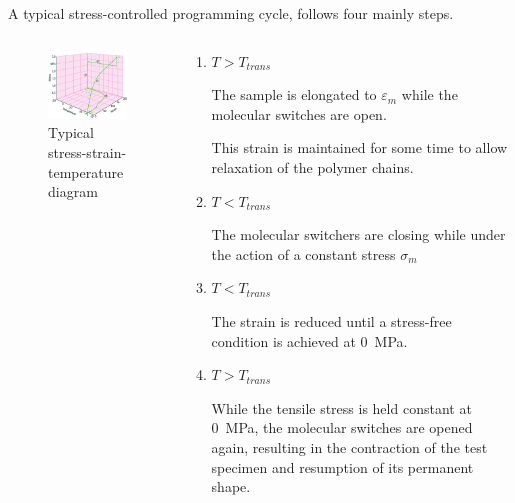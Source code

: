 \documentclass[10pt]{beamer}
\begin{document}
\begin{frame}
\footnotesize 
A typical stress-controlled programming cycle, follows four mainly steps. 

\begin{columns}
\begin{column}{0.5\textwidth}
\begin{figure}[H]
\centering
\includegraphics[width=0.8\linewidth]{figures/screenshot002}
\caption{Typical stress-strain-temperature diagram}
\label{fig:screenshot002}
\end{figure}
\end{column}
\begin{column}{0.5\textwidth}
\begin{enumerate}
\item $T>T_{trans}$ 

The sample is elongated to $\varepsilon_m$ while the molecular switches are open.

This strain is maintained for some time to allow relaxation of the polymer chains.


\item $T<T_{trans}$

The molecular switchers are closing while under the action of a constant stress $\sigma_m$

\item $T<T_{trans}$ 

The strain is reduced until a stress-free condition is
achieved at \SI{0}{\mega\pascal}.

\item $T>T_{trans}$

While the tensile stress is held constant at \SI{0}{\mega\pascal}, the molecular switches are opened
again, resulting in
the contraction of the test specimen and resumption of its permanent
shape.
\end{enumerate}
\end{column}
\end{columns}				
\end{frame}		
\end{document}
